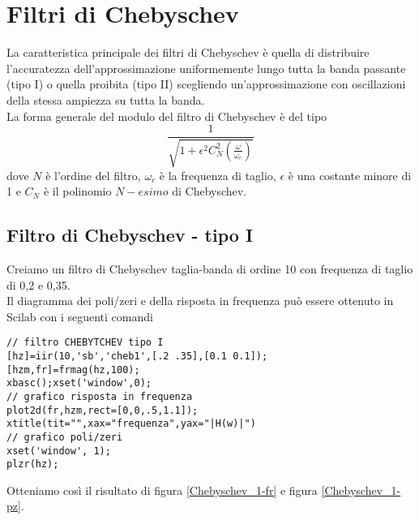 


\section{Filtri di Chebyschev}
La caratteristica principale dei filtri di Chebyschev \`e quella di distribuire l'accuratezza dell'approssimazione uniformemente lungo tutta la banda passante (tipo I) o quella proibita (tipo II) scegliendo un'approssimazione con oscillazioni della stessa ampiezza su tutta la banda.\\
La forma generale del modulo del filtro di Chebyschev \`e del tipo
\begin{displaymath}
\frac{1}{\sqrt{1+\epsilon^2C^{2}_{N}\left(\frac{\omega}{\omega_c}\right)}}
\end{displaymath}
dove $N$ \`e l'ordine del filtro, $\omega_c$ \`e la frequenza di taglio, $\epsilon$ \`e una costante minore di 1 e $C_N$ \`e il polinomio $N-esimo$ di Chebyschev.
\subsection{Filtro di Chebyschev - tipo I}
Creiamo un filtro di Chebyschev taglia-banda di ordine 10 con frequenza di taglio di 0,2 e 0,35.\\
Il diagramma dei poli/zeri e della risposta in frequenza pu\`o essere ottenuto in Scilab con i seguenti comandi
\begin{verbatim}
// filtro CHEBYTCHEV tipo I
[hz]=iir(10,'sb','cheb1',[.2 .35],[0.1 0.1]);
[hzm,fr]=frmag(hz,100);
xbasc();xset('window',0);
// grafico risposta in frequenza
plot2d(fr,hzm,rect=[0,0,.5,1.1]);
xtitle(tit="",xax="frequenza",yax="|H(w)|")
// grafico poli/zeri
xset('window', 1);
plzr(hz);
\end{verbatim}
Otteniamo cos\`i il risultato di figura \ref{Chebyschev_1-fr} e figura \ref{Chebyschev_1-pz}.



